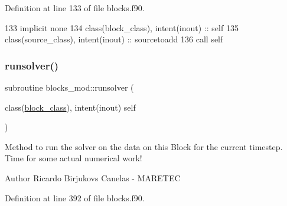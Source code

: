 Definition at line 133 of file blocks.\+f90.


\begin{DoxyCode}
133     \textcolor{keywordtype}{implicit none}
134     \textcolor{keywordtype}{class}(block\_class), \textcolor{keywordtype}{intent(inout)} :: self
135     \textcolor{keywordtype}{class}(source\_class), \textcolor{keywordtype}{intent(inout)} :: sourcetoadd
136     \textcolor{keyword}{call }self%
\end{DoxyCode}
\mbox{\label{namespaceblocks__mod_a3245bdadbec6bb123c517921d1503b48}} 
\subsubsection{\texorpdfstring{runsolver()}{runsolver()}}
{\footnotesize\ttfamily subroutine blocks\+\_\+mod\+::runsolver (\begin{DoxyParamCaption}\item[{class(\mbox{\hyperlink{structblocks__mod_1_1block__class}{block\+\_\+class}}), intent(inout)}]{self }\end{DoxyParamCaption})\hspace{0.3cm}{\ttfamily [private]}}



Method to run the solver on the data on this Block for the current timestep. Time for some actual numerical work! 

\begin{DoxyAuthor}{Author}
Ricardo Birjukovs Canelas -\/ M\+A\+R\+E\+T\+EC 
\end{DoxyAuthor}


Definition at line 392 of file blocks.\+f90.


\mbox{\label{namespaceblocks__mod_a5a9992de40470e417ec8e40e688f6a0e}} 
